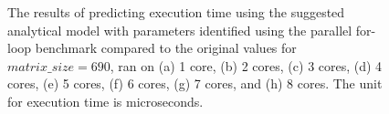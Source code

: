 \begin{figure}[H]
{		\label{fig52:h}}
	\caption{The results of predicting execution time using the suggested analytical model with parameters identified using the parallel for-loop benchmark compared to the original values for $matrix\_{size}=690$, ran on (a) 1 core, (b) 2 cores, (c) 3 cores, (d) 4 cores, (e) 5 cores, (f) 6 cores, (g) 7 cores, and (h) 8 cores. The unit for execution time is microseconds.}
	\label{fig52}	
\end{figure}

\begin{figure}[H]
	\centering
	\hfill
\end{figure}
